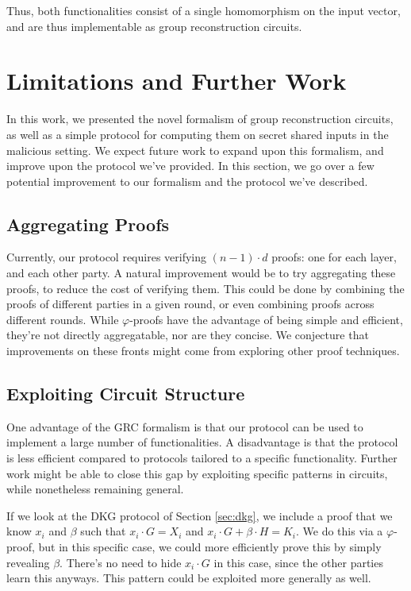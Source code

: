 Thus, both functionalities consist of a single homomorphism
on the input vector, and are thus implementable as group reconstruction
circuits.

\section{Limitations and Further Work}

In this work, we presented the novel formalism
of group reconstruction circuits, as well as a simple
protocol for computing them on secret shared inputs in the
malicious setting.
We expect future work to expand upon this formalism,
and improve upon the protocol we've provided.
In this section, we go over a few potential improvement
to our formalism and the protocol we've described.

\subsection{Aggregating Proofs}

Currently, our protocol requires verifying
$(n - 1) \cdot d$ proofs: one for each layer, and each other party.
A natural improvement would be to try aggregating these
proofs, to reduce the cost of verifying them.
This could be done by combining the proofs of different parties
in a given round, or even combining proofs across different rounds.
While $\varphi$-proofs have the advantage of being
simple and efficient, they're not directly aggregatable, nor
are they concise.
We conjecture that improvements on these fronts might come from
exploring other proof techniques.

\subsection{Exploiting Circuit Structure}

One advantage of the GRC formalism is that our protocol
can be used to implement a large number of functionalities.
A disadvantage is that the protocol is less efficient compared
to protocols tailored to a specific functionality.
Further work might be able to close this gap by exploiting
specific patterns in circuits, while nonetheless
remaining general.

If we look at the DKG protocol of Section \ref{sec:dkg},
we include a proof that we know $x_i$ and $\beta$ such that
$x_i \cdot G = X_i$ and $x_i \cdot G + \beta \cdot H = K_i$.
We do this via a $\varphi$-proof, but in this specific case,
we could more efficiently prove this by simply revealing $\beta$.
There's no need to hide $x_i \cdot G$ in this case, since the
other parties learn this anyways.
This pattern could be exploited more generally as well.


